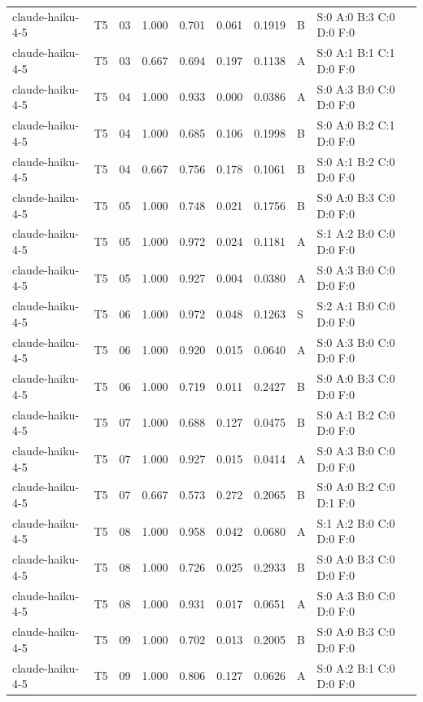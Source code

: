 \begin{longtable}{llrrrrrll}
claude-haiku-4-5 & T5 & 03 & 1.000 & 0.701 & 0.061 & 0.1919 & B & \tiny S:0 A:0 B:3 C:0 D:0 F:0 \\
claude-haiku-4-5 & T5 & 03 & 0.667 & 0.694 & 0.197 & 0.1138 & A & \tiny S:0 A:1 B:1 C:1 D:0 F:0 \\
claude-haiku-4-5 & T5 & 04 & 1.000 & 0.933 & 0.000 & 0.0386 & A & \tiny S:0 A:3 B:0 C:0 D:0 F:0 \\
claude-haiku-4-5 & T5 & 04 & 1.000 & 0.685 & 0.106 & 0.1998 & B & \tiny S:0 A:0 B:2 C:1 D:0 F:0 \\
claude-haiku-4-5 & T5 & 04 & 0.667 & 0.756 & 0.178 & 0.1061 & B & \tiny S:0 A:1 B:2 C:0 D:0 F:0 \\
claude-haiku-4-5 & T5 & 05 & 1.000 & 0.748 & 0.021 & 0.1756 & B & \tiny S:0 A:0 B:3 C:0 D:0 F:0 \\
claude-haiku-4-5 & T5 & 05 & 1.000 & 0.972 & 0.024 & 0.1181 & A & \tiny S:1 A:2 B:0 C:0 D:0 F:0 \\
claude-haiku-4-5 & T5 & 05 & 1.000 & 0.927 & 0.004 & 0.0380 & A & \tiny S:0 A:3 B:0 C:0 D:0 F:0 \\
claude-haiku-4-5 & T5 & 06 & 1.000 & 0.972 & 0.048 & 0.1263 & S & \tiny S:2 A:1 B:0 C:0 D:0 F:0 \\
claude-haiku-4-5 & T5 & 06 & 1.000 & 0.920 & 0.015 & 0.0640 & A & \tiny S:0 A:3 B:0 C:0 D:0 F:0 \\
claude-haiku-4-5 & T5 & 06 & 1.000 & 0.719 & 0.011 & 0.2427 & B & \tiny S:0 A:0 B:3 C:0 D:0 F:0 \\
claude-haiku-4-5 & T5 & 07 & 1.000 & 0.688 & 0.127 & 0.0475 & B & \tiny S:0 A:1 B:2 C:0 D:0 F:0 \\
claude-haiku-4-5 & T5 & 07 & 1.000 & 0.927 & 0.015 & 0.0414 & A & \tiny S:0 A:3 B:0 C:0 D:0 F:0 \\
claude-haiku-4-5 & T5 & 07 & 0.667 & 0.573 & 0.272 & 0.2065 & B & \tiny S:0 A:0 B:2 C:0 D:1 F:0 \\
claude-haiku-4-5 & T5 & 08 & 1.000 & 0.958 & 0.042 & 0.0680 & A & \tiny S:1 A:2 B:0 C:0 D:0 F:0 \\
claude-haiku-4-5 & T5 & 08 & 1.000 & 0.726 & 0.025 & 0.2933 & B & \tiny S:0 A:0 B:3 C:0 D:0 F:0 \\
claude-haiku-4-5 & T5 & 08 & 1.000 & 0.931 & 0.017 & 0.0651 & A & \tiny S:0 A:3 B:0 C:0 D:0 F:0 \\
claude-haiku-4-5 & T5 & 09 & 1.000 & 0.702 & 0.013 & 0.2005 & B & \tiny S:0 A:0 B:3 C:0 D:0 F:0 \\
claude-haiku-4-5 & T5 & 09 & 1.000 & 0.806 & 0.127 & 0.0626 & A & \tiny S:0 A:2 B:1 C:0 D:0 F:0 \\

\end{longtable}
